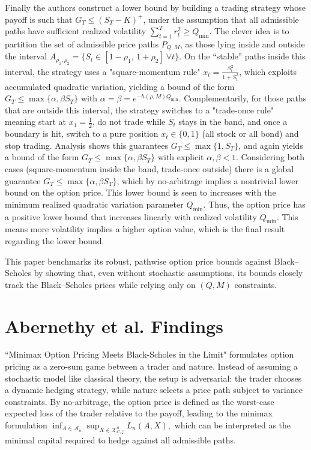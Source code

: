\documentclass[12pt]{article}
\begin{document}
Finally the authors construct a lower bound by building a trading strategy whose payoff is such that $G_T \le (S_T - K)^+$, under the assumption that all admissible paths have sufficient realized volatility $\sum_{t=1}^T r_t^2 \ge Q_{\min}$. The clever idea is to partition the set of admissible price paths $P_{Q,M}$, as those lying inside and outside the interval $A_{\rho_1,\rho_2} = \{S_t \in [1-\rho_1,\,1+\rho_2]\ \forall t\}$. On the “stable” paths inside this interval, the strategy uses a "square-momentum rule" $x_t = \frac{S_t^2}{1+S_t^2}$, which exploits accumulated quadratic variation, yielding a bound of the form $G_T \le \max\{\alpha, \beta S_T\}$ with $\alpha=\beta=e^{-h(\rho,M)Q_{\min}}$. Complementarily, for those paths that are outside this interval, the strategy switches to a "trade-once rule" meaning start at $x_1=\tfrac12$, do not trade while $S_t$ stays in the band, and once a boundary is hit, switch to a pure position $x_t \in \{0,1\}$ (all stock or all bond) and stop trading. Analysis shows this guarantees $G_T \le \max\{1,S_T\}$, and again yields a bound of the form $G_T \le \max\{\alpha, \beta S_T\}$ with explicit $\alpha,\beta < 1$. Considering both cases (square-momentum inside the band, trade-once outside) there is a global guarantee $G_T \le \max\{\alpha, \beta S_T\}$, which by no-arbitrage implies a nontrivial lower bound on the option price. This lower bound is seen to increases with the minimum realized quadratic variation parameter $Q_{\min}$. Thus, the option price has a positive lower bound that increases linearly with realized volatility $Q_{\min}$. This means more volatility implies a higher option value, which is the final result regarding the lower bound.

This paper benchmarks its robust, pathwise option price bounds against Black--Scholes by showing that, even without stochastic assumptions, its bounds closely track the Black--Scholes prices while relying only on $(Q,M)$ constraints.

\section*{Abernethy et al. Findings}
``Minimax Option Pricing Meets Black-Scholes in the Limit" \cite{abernethy2012minimax} formulates option pricing as a zero-sum game between a trader and nature. Instead of assuming a stochastic model like classical theory, the setup is adversarial: the trader chooses a dynamic hedging strategy, while nature selects a price path subject to variance constraints. By no-arbitrage, the option price is defined as the worst-case expected loss of the trader relative to the payoff, leading to the minimax formulation
$
\inf_{A \in \mathcal{A}_n} \sup_{X \in \mathcal{X}^n_{C,\zeta}} L_n(A,X),
$
which can be interpreted as the minimal capital required to hedge against all admissible paths.
\end{document}
